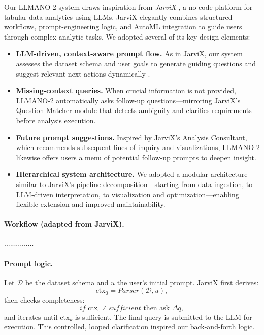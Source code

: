 \documentclass{article}
\begin{document}
Our LLMANO‑2 system draws inspiration from \textit{JarviX} , a no-code platform for tabular data analytics using LLMs. JarviX elegantly combines structured workflows, prompt-engineering logic, and AutoML integration to guide users through complex analytic tasks. We adopted several of its key design elements:

\begin{itemize}
    \item \textbf{LLM-driven, context-aware prompt flow.} As in JarviX, our system assesses the dataset schema and user goals to generate guiding questions and suggest relevant next actions dynamically .

    \item \textbf{Missing-context queries.} When crucial information is not provided, LLMANO‑2 automatically asks follow-up questions—mirroring JarviX’s Question Matcher module that detects ambiguity and clarifies requirements before analysis execution.
    \item \textbf{Future prompt suggestions.} Inspired by JarviX’s Analysis Consultant, which recommends subsequent lines of inquiry and visualizations, LLMANO‑2 likewise offers users a menu of potential follow-up prompts to deepen insight.
    \item \textbf{Hierarchical system architecture.} We adopted a modular architecture similar to JarviX’s pipeline decomposition—starting from data ingestion, to LLM-driven interpretation, to visualization and optimization—enabling flexible extension and improved maintainability.
\end{itemize}

\paragraph{Workflow (adapted from JarviX).}
...............


\paragraph{Prompt logic.}
Let $\mathcal{D}$ be the dataset schema and $u$ the user's initial prompt. JarviX first derives:
\[
\mathrm{ctx}_0 = \textit{Parser}(\mathcal{D}, u),
\]
then checks completeness:
\[
\textit{if } \mathrm{ctx}_0 \not\vdash \textit{sufficient} \text{ then ask }\Delta q,
\]
and iterates until $\mathrm{ctx}_k$ is sufficient. The final query is submitted to the LLM for execution. This controlled, looped clarification inspired our back-and-forth logic.
\end{document}
